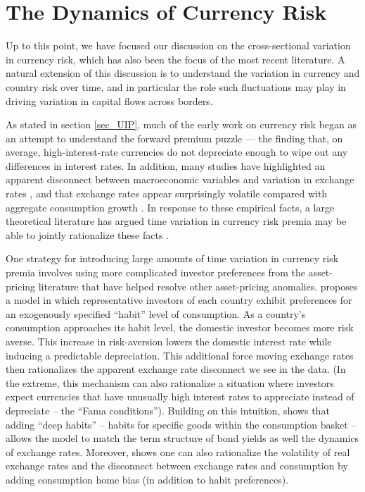 \documentclass[11pt]{article}
\begin{document}
\section{The Dynamics of Currency Risk\label{sec_dynamics}}

Up to this point, we have focused our discussion on the cross-sectional variation in currency risk, which has also been the focus of the most recent literature. A natural extension of this discussion is to understand the variation in currency and country risk over time, and in particular the role such fluctuations may play in driving variation in capital flows across borders.

As stated in section \ref{sec_UIP}, much of the early work on currency risk began as an attempt to understand the forward premium puzzle --- the finding that, on average, high-interest-rate currencies do not depreciate enough to wipe out any differences in interest rates. In addition, many studies have highlighted an apparent disconnect between macroeconomic variables and variation in exchange rates \citep{MeeseRogoff1983}, and that exchange rates appear surprisingly volatile compared with aggregate consumption growth \citep{BackusSmith1993}. In response to these empirical facts, a large theoretical literature has argued time variation in currency risk premia may be able to jointly rationalize these facts \citep{Fama1984,Backusetal2001}.

One strategy for introducing large amounts of time variation in currency risk premia involves using more complicated investor preferences from the asset-pricing literature that have helped resolve other asset-pricing anomalies. \citet{Verdelhan2010} proposes a model in which representative investors of each country exhibit preferences for an exogenously specified ``habit'' level of consumption. As a country's consumption approaches its habit level, the domestic investor becomes more risk averse. This increase in risk-aversion lowers the domestic interest rate while inducing a predictable depreciation. This additional force moving exchange rates then rationalizes the apparent exchange rate disconnect we see in the data. (In the extreme, this mechanism can also rationalize a situation where investors expect currencies that have unusually high interest rates to appreciate instead of depreciate -- the ``Fama conditions'').  Building on this intuition, \citet{Heyerdahl-Larsen2011} shows that adding ``deep habits'' -- habits for specific goods within the consumption basket -- allows the model to match the term structure of bond yields as well the dynamics of exchange rates. Moreover, \citet{Stathopoulos2017} shows one can also rationalize the volatility of real exchange rates and the disconnect between exchange rates and consumption by adding consumption home bias (in addition to habit preferences). 
\end{document}
